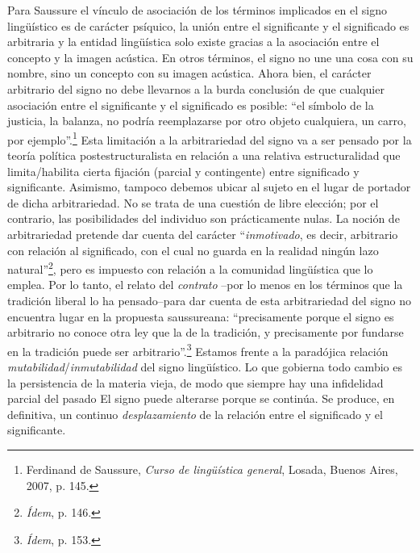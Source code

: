 Para Saussure el vínculo de asociación de los términos implicados en el
signo lingüístico es de carácter psíquico, la unión entre el
significante y el significado es arbitraria y la entidad lingüística
solo existe gracias a la asociación entre el concepto y la imagen
acústica. En otros términos, el signo no une una cosa con su nombre,
sino un concepto con su imagen acústica. Ahora bien, el carácter
arbitrario del signo no debe llevarnos a la burda conclusión de que
cualquier asociación entre el significante y el significado es posible:
\enquote{el símbolo de la justicia, la balanza, no podría reemplazarse por otro
objeto cualquiera, un carro, por ejemplo}.\footnote{Ferdinand de
  Saussure, \emph{Curso de lingüística general}, Losada, Buenos Aires,
  2007, p. 145.} Esta limitación a la arbitrariedad del signo va a ser
pensado por la teoría política postestructuralista en relación a una
relativa estructuralidad que limita/habilita cierta fijación (parcial y
contingente) entre significado y significante. Asimismo, tampoco debemos
ubicar al sujeto en el lugar de portador de dicha arbitrariedad. No se
trata de una cuestión de libre elección; por el contrario, las
posibilidades del individuo son prácticamente nulas. La noción de
arbitrariedad pretende dar cuenta del carácter \enquote{\emph{inmotivado}, es
decir, arbitrario con relación al significado, con el cual no guarda en
la realidad ningún lazo natural}\footnote{\emph{Ídem}, p. 146.}, pero es
impuesto con relación a la comunidad lingüística que lo emplea. Por lo
tanto, el relato del \emph{contrato} --por lo menos en los términos que
la tradición liberal lo ha pensado--para dar cuenta de esta
arbitrariedad del signo no encuentra lugar en la propuesta saussureana:
\enquote{precisamente porque el signo es arbitrario no conoce otra ley que la de
la tradición, y precisamente por fundarse en la tradición puede ser
arbitrario}.\footnote{\emph{Ídem}, p. 153.} Estamos frente a la
paradójica relación \emph{mutabilidad}/\emph{inmutabilidad} del signo
lingüístico. Lo que gobierna todo cambio es la persistencia de la
materia vieja, de modo que siempre hay una infidelidad parcial del
pasado El signo puede alterarse porque se continúa. Se produce, en
definitiva, un continuo \emph{desplazamiento} de la relación entre el
significado y el significante.


